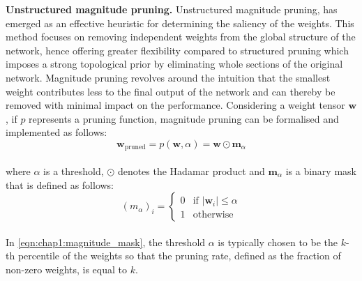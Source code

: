 

\noindent\textbf{Unstructured magnitude pruning.} Unstructured magnitude
pruning, has emerged as an effective heuristic for determining the saliency of
the weights. This method focuses on removing independent weights from the global
structure of the network, hence offering greater flexibility compared to
structured pruning which imposes a strong topological prior by eliminating whole
sections of the original network. Magnitude pruning revolves around the
intuition that the smallest weight contributes less to the final output of the
network and can thereby be removed with minimal impact on the performance.
Considering a weight tensor $\mathbf{w}$, if $p$ represents a pruning function,
magnitude pruning can be formalised and implemented as follows:\\

\begin{equation}
  \label{eqn:chap1:magnitude_pruning}
  \mathbf{w}_{\text{pruned}} = p(\mathbf{w}, \alpha) = \mathbf{w} \odot \mathbf{m}_\alpha
\end{equation}\\

\noindent where $\alpha$ is a threshold, $\odot$ denotes the Hadamar product and
$\mathbf{m}_\alpha$ is a binary mask that is defined as follows:\\

\begin{equation}
  \label{eqn:chap1:magnitude_mask}
  (m_\alpha)_i = \begin{cases}
  0 & \text{if } |\mathbf{w}_i| \leq \alpha \\
    1 & \text{otherwise}
  \end{cases}
\end{equation}\\

\noindent In \cref{eqn:chap1:magnitude_mask}, the threshold $\alpha$ is
typically chosen to be the $k$-th percentile of the weights so that the pruning
rate, defined as the fraction of non-zero weights, is equal to $k$.\\

